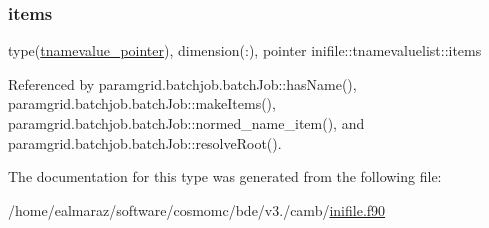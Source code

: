 \mbox{\label{structinifile_1_1tnamevaluelist_aa8ff02d56d12795312f87aec08f1e40d}} 
\subsubsection{\texorpdfstring{items}{items}}
{\footnotesize\ttfamily type(\mbox{\hyperlink{structinifile_1_1tnamevalue__pointer}{tnamevalue\+\_\+pointer}}), dimension(\+:), pointer inifile\+::tnamevaluelist\+::items}



Referenced by paramgrid.\+batchjob.\+batch\+Job\+::has\+Name(), paramgrid.\+batchjob.\+batch\+Job\+::make\+Items(), paramgrid.\+batchjob.\+batch\+Job\+::normed\+\_\+name\+\_\+item(), and paramgrid.\+batchjob.\+batch\+Job\+::resolve\+Root().



The documentation for this type was generated from the following file\+:\begin{DoxyCompactItemize}
\item 
/home/ealmaraz/software/cosmomc/bde/v3./camb/\mbox{\hyperlink{inifile_8f90}{inifile.\+f90}}\end{DoxyCompactItemize}
